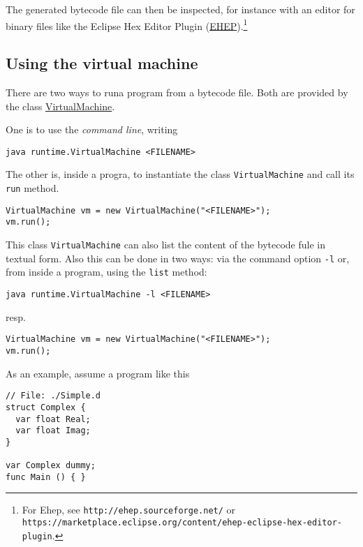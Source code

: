 \documentclass[11pt]{article}
\begin{document}
The generated bytecode file can then be inspected, for instance with an
editor for binary files like the Eclipse Hex Editor Plugin (\href{http://ehep.sourceforge.net/}{EHEP}).\footnote{For Ehep, see \texttt{http://ehep.sourceforge.net/} or
\texttt{https://marketplace.eclipse.org/content/ehep-eclipse-hex-editor-plugin}.}

\subsection{Using the virtual machine}
\label{sec:org9e7a559}

There are two ways to runa program from a bytecode file. Both are provided
by the class \href{../../../material/oblig2-patch/src/runtime/VirtualMachine.java}{VirtualMachine}.


One is to use the \emph{command line}, writing


\begin{verbatim}
java runtime.VirtualMachine <FILENAME>
\end{verbatim}

The other is, inside a progra, to instantiate the class \texttt{VirtualMachine}
and call its \texttt{run} method.

\begin{verbatim}
VirtualMachine vm = new VirtualMachine("<FILENAME>");
vm.run();
\end{verbatim}

This class \texttt{VirtualMachine} can also list the content of the bytecode fule
in textual form. Also this can be done in two ways: via the command option
\texttt{-l} or, from inside a program, using the \texttt{list} method:

\begin{verbatim}
java runtime.VirtualMachine -l <FILENAME>
\end{verbatim}

resp.

\begin{verbatim}
VirtualMachine vm = new VirtualMachine("<FILENAME>");
vm.run();
\end{verbatim}

As an example, assume a program like this

\lstset{language=java,label= ,caption= ,captionpos=b,numbers=none}
\begin{lstlisting}
// File: ./Simple.d
struct Complex {
  var float Real;
  var float Imag;
}

var Complex dummy;
func Main () { }
\end{lstlisting}
\end{document}
